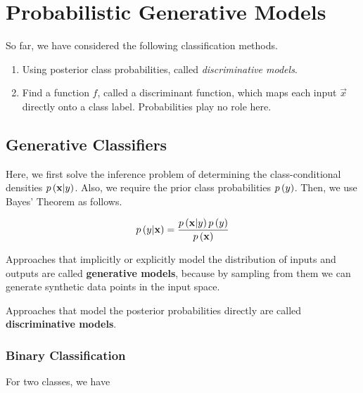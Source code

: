 \documentclass[twoside]{article}
\begin{document}



\section{Probabilistic Generative Models}

So far, we have considered the following classification methods.

\begin{enumerate} 
    \item Using posterior class probabilities, called \emph{discriminative
        models}.
    \item Find a function \(f\), called a discriminant function, which maps each
        input \(\vec{x}\) directly onto a class label. Probabilities play no
        role here. 
\end{enumerate}

\subsection{Generative Classifiers}

Here, we first solve the inference problem of determining the class-conditional
densities \(p\left(\boldsymbol{\mathbf{x}}|y\right)\). Also, we require the prior class probabilities
\(p\left(y\right)\). Then, we use Bayes' Theorem as follows.

\begin{equation} 
    p\left(y|\boldsymbol{\mathbf{x}}\right) = \frac{p\left(\boldsymbol{\mathbf{x}}|y\right)p\left(y\right)}{p\left(\boldsymbol{\mathbf{x}}\right)}
\end{equation}

Approaches that implicitly or explicitly model the distribution of inputs and
outputs are called \textbf{generative models}, because by sampling from them we
can generate synthetic data points in the input space.

Approaches that model the posterior probabilities directly are called
\textbf{discriminative models}.

\subsubsection{Binary Classification}
For two classes, we have
\end{document}
